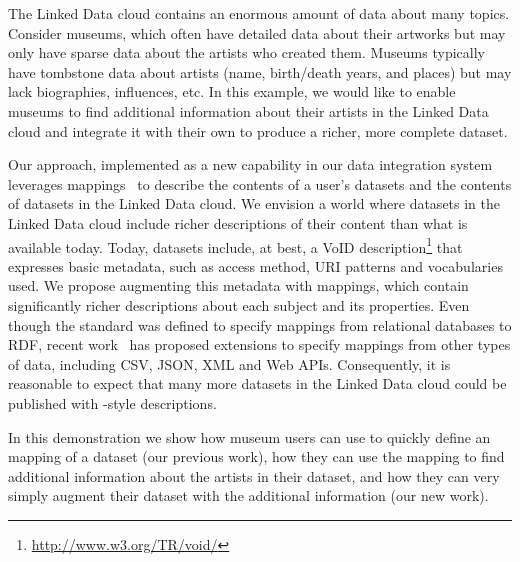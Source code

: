 The Linked Data cloud contains an enormous amount of data about many topics.
Consider museums, which often have detailed data about their artworks but may only have sparse data about the artists who created them.
Museums typically have tombstone data about artists (name, birth/death years, and places) but may lack biographies, influences, etc.
In this example, we would like to enable museums to find additional information about their artists in the Linked Data cloud and integrate it with their own to produce a richer, more complete dataset.

Our approach, implemented as a new capability in our \karma data integration system~\cite{knoblock12:eswc} leverages \rtworml mappings~\cite{Sundara:12:RRR} to describe the contents of a user's datasets and the contents of datasets in the Linked Data cloud.
We envision a world where datasets in the Linked Data cloud include richer descriptions of their content than what is available today.
Today, datasets include, at best, a VoID description\footnote{\url{http://www.w3.org/TR/void/}} that expresses basic metadata, such as access method, URI patterns and vocabularies used.
We propose augmenting this metadata with \rtworml mappings, which contain significantly richer descriptions about each subject and its properties.
Even though the \rtworml standard was defined to specify mappings from relational databases to RDF, recent work~\cite{conf/semweb/DimouSCMW13} has proposed extensions to specify mappings from other types of data, including CSV, JSON, XML and Web APIs.
Consequently, it is reasonable to expect that many more datasets in the Linked Data cloud could be published with \rtworml-style descriptions.

In this demonstration we show how museum users can use \karma to quickly define an \rtworml mapping of a dataset (our previous work), how they can use the \rtworml mapping to find additional information about the artists in their dataset, and how they can very simply augment their dataset with the additional information (our new work).